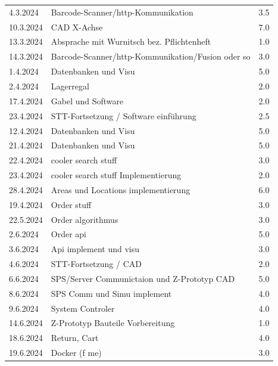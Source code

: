 \begin{longtable}{|l|p{10cm}|r|}
4.3.2024	&Barcode-Scanner/http-Kommunikation&	3.5\\
10.3.2024	&CAD X-Achse	&7.0\\

13.3.2024	&Absprache mit Wurnitsch bez. Pflichtenheft	&1.0\\
14.3.2024	&Barcode-Scanner/http-Kommunikation/Fusion oder so&	3.0\\
1.4.2024	&Datenbanken und Visu	&5.0\\

2.4.2024	&Lagerregal&	2.0\\
17.4.2024	&Gabel und Software&	2.0\\
23.4.2024	&STT-Fortsetzung / Software einführung&	2.5\\
12.4.2024	&Datenbanken und Visu	&5.0\\
21.4.2024	&Datenbanken und Visu	&5.0\\
22.4.2024	&cooler search stuff	&3.0\\
23.4.2024	&cooler search stuff Implementierung	&2.0\\
28.4.2024	&Areas und Locations implementierung	&6.0\\
19.4.2024	&Order stuff	&3.0\\
22.5.2024	&Order algorithmus	&3.0\\
2.6.2024	&Order api	&5.0\\
3.6.2024	&Api implement und visu	&3.0\\

4.6.2024	&STT-Fortsetzung / CAD&	2.0\\
6.6.2024	&SPS/Server Communictaion und Z-Prototyp CAD	&5.0\\
8.6.2024	&SPS Comm und Simu implement	&4.0\\
9.6.2024	&System Controler	&4.0\\

14.6.2024	&Z-Prototyp Bauteile Vorbereitung&	1.0\\
18.6.2024	&Return, Cart	&4.0\\
19.6.2024	&Docker (f me)	&3.0\\


\end{longtable}
